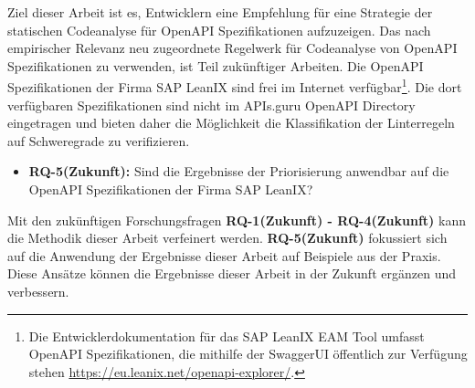   Ziel dieser Arbeit ist es, Entwicklern eine Empfehlung für eine Strategie der statischen Codeanalyse für OpenAPI Spezifikationen aufzuzeigen. Das nach empirischer Relevanz neu zugeordnete Regelwerk für Codeanalyse von OpenAPI Spezifikationen zu verwenden, ist Teil zukünftiger Arbeiten. Die OpenAPI Spezifikationen der Firma SAP LeanIX sind frei im Internet verfügbar\footnote{Die Entwicklerdokumentation für das SAP LeanIX \acf{EAM} Tool umfasst OpenAPI Spezifikationen, die mithilfe der SwaggerUI öffentlich zur Verfügung stehen \href{https://eu.leanix.net/openapi-explorer/}{https://eu.leanix.net/openapi-explorer/}.}. Die dort verfügbaren Spezifikationen sind nicht im APIs.guru OpenAPI Directory eingetragen und bieten daher die Möglichkeit die Klassifikation der Linterregeln auf Schweregrade zu verifizieren.
  
  \begin{itemize}
    \item \textbf{RQ-5(Zukunft):} Sind die Ergebnisse der Priorisierung anwendbar auf die OpenAPI Spezifikationen der Firma SAP LeanIX?
  \end{itemize}

  Mit den zukünftigen Forschungsfragen \textbf{RQ-1(Zukunft) - RQ-4(Zukunft)} kann die Methodik dieser Arbeit verfeinert werden. \textbf{RQ-5(Zukunft)} fokussiert sich auf die Anwendung der Ergebnisse dieser Arbeit auf Beispiele aus der Praxis. Diese Ansätze können die Ergebnisse dieser Arbeit in der Zukunft ergänzen und verbessern.
